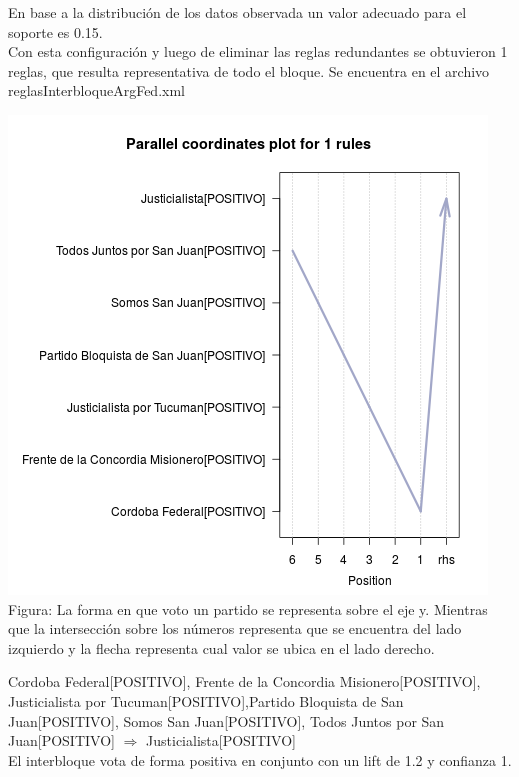 \documentclass{endm}
\begin{document}
En base a la distribución de los datos observada un valor adecuado para el soporte es 0.15.\\

Con esta configuración y luego de eliminar las reglas redundantes se obtuvieron 1 reglas, que resulta representativa de todo el bloque. Se encuentra en el archivo reglasInterbloqueArgFed.xml  \\

\begin{center}
\includegraphics[scale=0.4]{graficos/paracoordArgFed.png} \\
\scriptsize{Figura: La forma en que voto un partido se representa sobre el eje y. Mientras que la intersección sobre  los números representa que se encuentra del lado izquierdo y la flecha representa cual valor se ubica en el lado derecho.} \\
\end{center}   

{Cordoba Federal[POSITIVO], Frente de la Concordia Misionero[POSITIVO], Justicialista por Tucuman[POSITIVO],Partido Bloquista de San Juan[POSITIVO], Somos San Juan[POSITIVO], Todos Juntos por San Juan[POSITIVO]} $\Longrightarrow$ {Justicialista[POSITIVO]} \\

El interbloque vota de forma positiva en conjunto con un lift de 1.2 y confianza 1. \\
\end{document}
